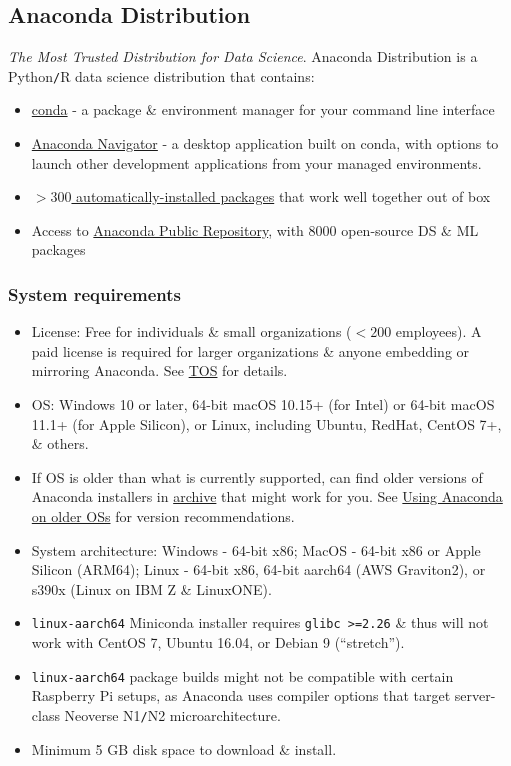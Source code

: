 \documentclass{article}
\begin{document}
\subsection{Anaconda Distribution}
{\it The Most Trusted Distribution for Data Science}. Anaconda Distribution is a Python{\tt/}R data science distribution that contains:
\begin{itemize}
	\item \href{https://docs.conda.io/en/latest}{conda} - a package \& environment manager for your command line interface
	\item \href{https://docs.anaconda.com/navigator/}{Anaconda Navigator} - a desktop application built on conda, with options to launch other development applications from your managed environments.
	\item \href{https://docs.anaconda.com/anaconda/release-notes/}{$> 300$ automatically-installed packages} that work well together out of box
	\item Access to \href{https://repo.anaconda.com/pkgs/}{Anaconda Public Repository}, with 8000 open-source DS \& ML packages
\end{itemize}

\subsubsection{System requirements}

\begin{itemize}
	\item License: Free for individuals \& small organizations ($< 200$ employees). A paid license is required for larger organizations \& anyone embedding or mirroring Anaconda. See \href{https://legal.anaconda.com/policies/en/}{TOS} for details.
	\item OS: Windows 10 or later, 64-bit macOS 10.15+ (for Intel) or 64-bit macOS 11.1+ (for Apple Silicon), or Linux, including Ubuntu, RedHat, CentOS 7+, \& others.
	\item If OS is older than what is currently supported, can find older versions of Anaconda installers in \href{https://repo.anaconda.com/archive/}{archive} that might work for you. See \href{https://docs.anaconda.com/anaconda/advanced-install/old-os/#older-versions-distro}{Using Anaconda on older OSs} for version recommendations.
	\item System architecture: Windows - 64-bit x86; MacOS - 64-bit x86 or Apple Silicon (ARM64); Linux - 64-bit x86, 64-bit aarch64 (AWS Graviton2), or s390x (Linux on IBM Z \& LinuxONE).
	\item {\tt linux-aarch64} Miniconda installer requires {\tt glibc >=2.26} \& thus will not work with CentOS 7, Ubuntu 16.04, or Debian 9 (``stretch'').
	\item {\tt linux-aarch64} package builds might not be compatible with certain Raspberry Pi setups, as Anaconda uses compiler options that target server-class Neoverse N1{\tt/}N2 microarchitecture.
	\item Minimum 5 GB disk space to download \& install.
\end{itemize}
\end{document}
